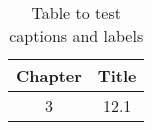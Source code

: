 \begin{table}[h!]
\centering
\begin{tabular}{cc}
{Chapter} & {Title} \\ 
\hline
{3} & {12.1} \\
\end{tabular}
\caption{Table to test captions and labels}
\label{table:1}
\end{table}